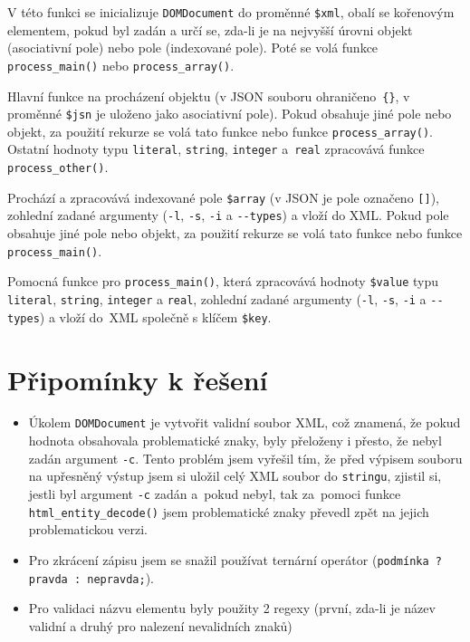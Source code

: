 \documentclass[a4paper, 10pt]{article}
\begin{document}
\begin{description}
	\setlength\itemsep{0pt}

	\item[\texttt{JSON2XML(\$int)}] V této funkci se inicializuje \verb|DOMDocument| do proměnné \verb|$xml|, obalí se kořenovým elementem, pokud byl zadán a určí se, zda-li je na nejvyšší úrovni objekt (asociativní pole) nebo pole (indexované pole). Poté se volá funkce \verb|process_main()| nebo \verb|process_array()|.
	
	\item[\texttt{process\_main(\$node, array \$array)}] Hlavní funkce na procházení objektu (v JSON souboru ohraničeno~\verb|{}|, v proměnné \verb|$jsn| je uloženo jako asociativní pole). Pokud obsahuje jiné pole nebo objekt, za použití rekurze se volá tato funkce nebo funkce \verb|process_array()|. Ostatní hodnoty typu \verb|literal|, \verb|string|, \verb|integer| a~\verb|real| zpracovává funkce \verb|process_other()|.
	
	\item[\texttt{process\_array(\$node, array \$array)}] Prochází a zpracovává indexované pole \verb|$array| (v JSON je pole označeno \verb|[]|), zohlední zadané argumenty (\verb|-l|, \verb|-s|, \verb|-i| a \verb|--types|) a vloží do XML. Pokud pole obsahuje jiné pole nebo objekt, za použití rekurze se volá tato funkce nebo funkce \verb|process_main()|.
	
	\item[\texttt{process\_other(\$node, \$key, \$value)}] Pomocná funkce pro \verb|process_main()|, která zpracovává hodnoty \verb|$value| typu \verb|literal|, \verb|string|, \verb|integer| a \verb|real|, zohlední zadané argumenty (\verb|-l|, \verb|-s|, \verb|-i| a \verb|--types|) a vloží do~XML společně s klíčem \verb|$key|.
	
\end{description}

\section*{Připomínky k řešení}

\begin{itemize}
	\setlength\itemsep{0pt}
	
	\item Úkolem \verb|DOMDocument| je vytvořit validní soubor XML, což znamená, že pokud hodnota obsahovala problematické znaky, byly přeloženy i přesto, že nebyl zadán argument \verb|-c|. Tento problém jsem vyřešil tím, že před výpisem souboru na upřesněný výstup jsem si uložil celý XML soubor do \verb|stringu|, zjistil si, jestli byl argument \verb|-c| zadán a~pokud nebyl, tak za~pomoci funkce \verb|html_entity_decode()| jsem problematické znaky převedl zpět na jejich problematickou verzi.
	
	\item Pro zkrácení zápisu jsem se snažil používat ternární operátor (\verb|podmínka ? pravda : nepravda;|).
	
	\item Pro validaci názvu elementu byly použity 2 regexy (první, zda-li je název validní a druhý pro nalezení nevalidních znaků)
	
\end{itemize}
\end{document}
